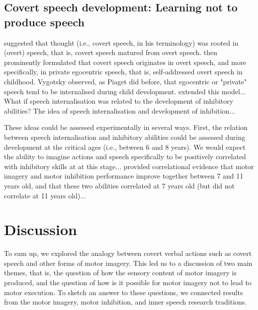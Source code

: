 \documentclass[utf8]{template/frontiersSCNS} %
\begin{document}
\subsection{Covert speech development: Learning not to produce speech}

\cite{watson_psychology_1919} suggested that thought (i.e., covert speech, in his terminology) was rooted in (overt) speech, that is, covert speech matured from overt speech. \cite{vygotsky_thought_1934} then prominently formulated that covert speech originates in overt speech, and more specifically, in private egocentric speech, that is, self-addressed overt speech in childhood. Vygotsky observed, as Piaget did before, that egocentric or "private" speech tend to be internalised during child development. \cite{fernyhough_alien_2004} extended this model... What if speech internalisation was related to the development of inhibitory abilities? The idea of speech internalisation and development of inhibition...

These ideas could be assessed experimentally in several ways. First, the relation between speech internalisation and inhibitory abilities could be assessed during development at the critical ages (i.e., between 6 and 8 years). We would expect the ability to imagine actions and speech specifically to be positively correlated with inhibitory skills at at this stage...  \cite{wang_relationship_2021} provided correlational evidence that motor imagery and motor inhibition performance improve together between 7 and 11 years old, and that these two abilities correlated at 7 years old (but did not correlate at 11 years old)...

\section{Discussion}


To sum up, we explored the analogy between covert verbal actions such as covert speech and other forms of motor imagery. This led us to a discussion of two main themes, that is, the question of how the sensory content of motor imagery is produced, and the question of how is it possible for motor imagery not to lead to motor execution. To sketch an answer to these questions, we connected results from the motor imagery, motor inhibition, and inner speech research traditions.
\end{document}
